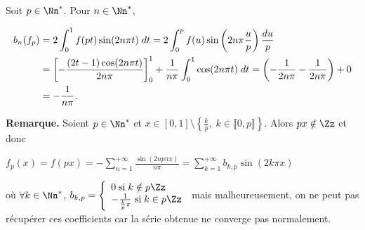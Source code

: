 {{\item  Soit $p\in\Nn^*$. Pour $n\in\Nn^*$,

\begin{align*}\ensuremath
b_n(f_p)&=2\int_{0}^{1}f(pt)\sin(2n\pi t)\;dt=2\int_{0}^{p}f(u)\sin\left(2n\pi \frac{u}{p}\right)\frac{du}{p}\\
 &=\left[-\frac{(2t-1)\cos(2n\pi t)}{2n\pi}\right]_0^1+\frac{1}{n\pi}\int_{0}^{1}\cos(2n\pi t)\;dt=\left(-\frac{1}{2n\pi}-\frac{1}{2n\pi}\right)+0\\
 &=-\frac{1}{n\pi}.
\end{align*}

\textbf{Remarque.} Soient $p\in\Nn^*$ et $x\in[0,1]\setminus\left\{
\frac{k}{p},\;k\in\llbracket0,p\rrbracket\right\}$. Alors $px\notin\Zz$ et donc

\begin{center}
$f_p(x)=f(px)=-\sum_{n=1}^{+\infty}\frac{\sin(2np\pi x)}{n\pi}=\sum_{k=1}^{+\infty}b_{k,p}\sin(2k\pi x)$
\end{center}

où $\forall k\in\Nn^*$, $b_{k,p}=\left\{
\begin{array}{l}
0\;\text{si}\;k\notin p\Zz\\
-\frac{1}{\frac{k}{p}\pi}\;\text{si}\;k\in p\Zz
\end{array}
\right.$ mais malheureusement, on ne peut pas récupérer ces coefficients car la série obtenue ne converge pas normalement.

\begin{center}
\end{center}
}
}
